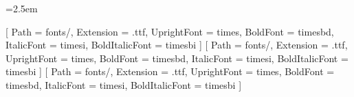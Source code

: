 
\usepackage[
    a4paper,
    top=2.5cm,
    bottom=2.5cm,
    left=3.5cm,
    right=2.5cm,
    headheight=20pt
]{geometry}

\usepackage[fontsize=13pt]{scrextend}
\usepackage{setspace}
\renewcommand{\onehalfspacing}{\setstretch{1.45}}

\setlength{\parindent}{1.0cm}
\usepackage{indentfirst}
\setlength{\parskip}{0pt}
\emergencystretch=2.5em

\renewcommand{\footnotesize}{\fontsize{10}{13}\selectfont}

\renewcommand{\topfraction}{0.88}
\renewcommand{\bottomfraction}{0.88}
\renewcommand{\textfraction}{0.12}
\renewcommand{\floatpagefraction}{0.75}
\setlength{\floatsep}{8pt plus 2pt minus 2pt}
\setlength{\textfloatsep}{12pt plus 2pt minus 2pt}
\setlength{\intextsep}{10pt plus 2pt minus 2pt}

\usepackage{fontspec}
\setmainfont{Times New Roman}[
    Path = fonts/,
    Extension = .ttf,
    UprightFont = times,
    BoldFont = timesbd,
    ItalicFont = timesi,
    BoldItalicFont = timesbi
]
\setsansfont{Times New Roman}[
    Path = fonts/,
    Extension = .ttf,
    UprightFont = times,
    BoldFont = timesbd,
    ItalicFont = timesi,
    BoldItalicFont = timesbi
]
\setmonofont{Times New Roman}[
    Path = fonts/,
    Extension = .ttf,
    UprightFont = times,
    BoldFont = timesbd,
    ItalicFont = timesi,
    BoldItalicFont = timesbi
]
\renewcommand{\ttdefault}{\rmdefault}
\usepackage[provide=*,vietnamese]{babel}
\addto\captionsvietnamese{%
    \renewcommand{\contentsname}{MỤC LỤC}%
    \renewcommand{\listtablename}{DANH MỤC BẢNG BIỂU}%
    \renewcommand{\listfigurename}{DANH MỤC HÌNH ẢNH}%
    \renewcommand{\bibname}{TÀI LIỆU THAM KHẢO}%
}

\usepackage{amsmath,amsfonts,amssymb}
\usepackage{graphicx}
\usepackage{tikz}
\usetikzlibrary{shapes.geometric, arrows.meta, positioning, fit, calc, backgrounds}
\usepackage{booktabs}
\usepackage{tabularx}
\usepackage{longtable}
\usepackage{xltabular}
\usepackage{multirow}
\usepackage{array}
\usepackage{enumitem}
\usepackage{float}
\usepackage{placeins}
\usepackage{needspace}

